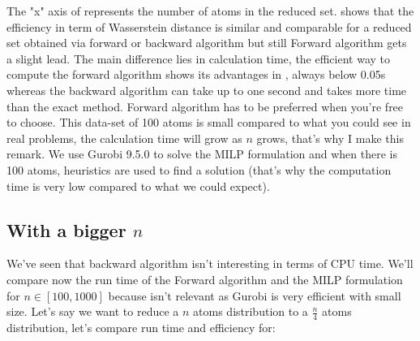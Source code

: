 \documentclass{amsart}
\begin{document}
The "x" axis of  represents the number of atoms in the reduced set.  shows that the efficiency in term of Wasserstein distance is similar and comparable for a reduced set obtained via forward or backward algorithm but still Forward algorithm gets a slight lead. The main difference lies in calculation time, the efficient way to compute the forward algorithm shows its advantages in , always below 0.05s whereas the backward algorithm can take up to one second and takes more time than the exact method. Forward algorithm has to be preferred when you're free to choose.  This data-set of 100 atoms is small compared to what you could see in real problems, the calculation time will grow as $n$ grows, that's why I make this remark. We use Gurobi 9.5.0 to solve the MILP formulation and when there is 100 atoms, heuristics are used to find a solution (that's why the computation time is very low compared to what we could expect). 

\subsection{With a bigger $n$}
We've seen that backward algorithm isn't interesting in terms of CPU time. We'll compare now the run time of the Forward algorithm and the MILP formulation for $n\in\left[100,1000\right]$ because  isn't relevant as Gurobi is very efficient with small size. Let's say we want to reduce a $n$ atoms distribution to a $\frac{n}{4}$ atoms distribution, let's compare run time and efficiency for:
\end{document}
